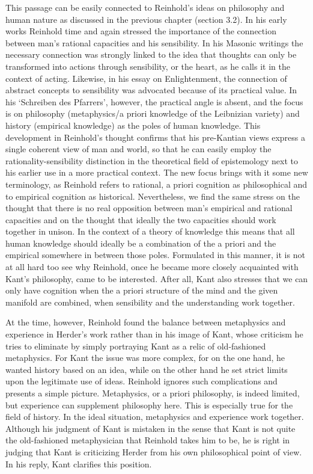 This passage can be easily connected to Reinhold's ideas on philosophy and human nature as discussed in the previous chapter (section 3.2). In his early works Reinhold time and again stressed the importance of the connection between man's rational capacities and his sensibility. In his Masonic writings the necessary connection was strongly linked to the idea that thoughts can only be transformed into actions through sensibility, or the heart, as he calls it in the context of acting. Likewise, in his essay on Enlightenment, the connection of abstract concepts to sensibility was advocated because of its practical value. In his `Schreiben des Pfarrers', however, the practical angle is absent, and the focus is on philosophy (metaphysics/a priori knowledge of the Leibnizian variety) and history (empirical knowledge) as the poles of human knowledge. This development in Reinhold's thought confirms that his pre{-}Kantian views express a single coherent view of man and world, so that he can easily employ the rationality{-}sensibility distinction in the theoretical field of epistemology next to his earlier use in a more practical context. The new focus brings with it some new terminology, as Reinhold refers to rational, a priori cognition as philosophical and to empirical cognition as historical. Nevertheless, we find the same stress on the thought that there is no real opposition between man's empirical and rational capacities and on the thought that ideally the two capacities should work together in unison. In the context of a theory of knowledge this means that all human knowledge should ideally be a combination of the a priori and the empirical somewhere in between those poles. Formulated in this manner, it is not at all hard too see why Reinhold, once he became more closely acquainted with Kant's philosophy, came to be interested. After all, Kant also stresses that we can only have cognition when the a priori structure of the mind and the given manifold are combined, when sensibility and the understanding work together. 

 At the time, however, Reinhold found the balance between metaphysics and experience in Herder's work rather than in his image of Kant, whose criticism he tries to eliminate by simply portraying Kant as a relic of old{-}fashioned metaphysics. For Kant the issue was more complex, for on the one hand, he wanted history based on an idea, while on the other hand he set strict limits upon the legitimate use of ideas. Reinhold ignores such complications and presents a simple picture. Metaphysics, or a priori philosophy, is indeed limited, but experience can supplement philosophy here. This is especially true for the field of history. In the ideal situation, metaphysics and experience work together. Although his judgment of Kant is mistaken in the sense that Kant is not quite the old{-}fashioned metaphysician that Reinhold takes him to be, he is right in judging that Kant is criticizing Herder from his own philosophical point of view. In his reply, Kant clarifies this position. 


